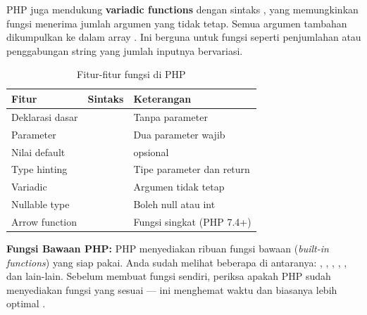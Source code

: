 PHP juga mendukung \textbf{variadic functions} dengan sintaks , yang memungkinkan fungsi menerima jumlah argumen yang tidak tetap. Semua argumen tambahan dikumpulkan ke dalam array . Ini berguna untuk fungsi seperti penjumlahan atau penggabungan string yang jumlah inputnya bervariasi.

\begin{table}[H]
\centering
\begin{tabular}{|P{3.5cm}|P{4cm}|P{4.5cm}|}
\hline
\textbf{Fitur} & \textbf{Sintaks} & \textbf{Keterangan} \\
\hline
Deklarasi dasar &  & Tanpa parameter \\
\hline
Parameter &  & Dua parameter wajib \\
\hline
Nilai default &  &  opsional \\
\hline
Type hinting &  & Tipe parameter dan return \\
\hline
Variadic &  & Argumen tidak tetap \\
\hline
Nullable type &  & Boleh null atau int \\
\hline
Arrow function &  & Fungsi singkat (PHP 7.4+) \\
\hline
\end{tabular}
\caption{Fitur-fitur fungsi di PHP}
\end{table}

\begin{konsep}
\textbf{Fungsi Bawaan PHP:} PHP menyediakan ribuan fungsi bawaan (\textit{built-in functions}) yang siap pakai. Anda sudah melihat beberapa di antaranya: , , , , , dan lain-lain. Sebelum membuat fungsi sendiri, periksa apakah PHP sudah menyediakan fungsi yang sesuai --- ini menghemat waktu dan biasanya lebih optimal \cite{phpManual}.
\end{konsep}

